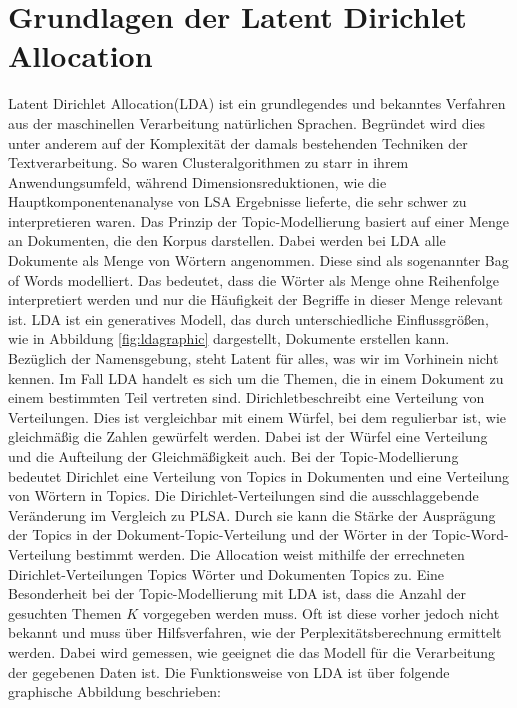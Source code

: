 \documentclass[german,version-2020-11]{uzl-thesis}
\begin{document}
\section{Grundlagen der Latent Dirichlet Allocation }
Latent Dirichlet Allocation(LDA) ist ein grundlegendes und bekanntes Verfahren aus der maschinellen Verarbeitung natürlichen Sprachen. Begründet wird dies unter anderem auf der Komplexität der damals bestehenden Techniken der Textverarbeitung. So waren Clusteralgorithmen zu starr in ihrem Anwendungsumfeld, während Dimensionsreduktionen, wie die Hauptkomponentenanalyse von LSA Ergebnisse lieferte, die sehr schwer zu interpretieren waren. Das Prinzip der Topic-Modellierung basiert auf einer Menge an Dokumenten, die den Korpus darstellen. Dabei werden bei LDA alle Dokumente als Menge von Wörtern angenommen. Diese sind als sogenannter Bag of Words modelliert. Das bedeutet, dass die Wörter als Menge ohne Reihenfolge interpretiert werden und nur die Häufigkeit der Begriffe in dieser Menge relevant ist. LDA ist ein generatives Modell, das durch unterschiedliche Einflussgrößen, wie in Abbildung \ref{fig:ldagraphic} dargestellt, Dokumente erstellen kann. \\

Bezüglich der Namensgebung, steht \glqq Latent \grqq für alles, was wir im Vorhinein nicht kennen. Im Fall LDA handelt es sich um die Themen, die in einem Dokument zu einem bestimmten Teil vertreten sind. \glqq Dirichlet\grqq beschreibt eine Verteilung von Verteilungen. Dies ist vergleichbar mit einem Würfel, bei dem regulierbar ist, wie gleichmäßig die Zahlen gewürfelt werden. Dabei ist der Würfel eine Verteilung und die Aufteilung der Gleichmäßigkeit auch. Bei der Topic-Modellierung bedeutet Dirichlet eine Verteilung von Topics in Dokumenten und eine Verteilung von Wörtern in Topics. Die Dirichlet-Verteilungen sind die ausschlaggebende Veränderung im Vergleich zu PLSA. Durch sie kann die Stärke der Ausprägung der Topics in der Dokument-Topic-Verteilung und der Wörter in der Topic-Word-Verteilung bestimmt werden. Die \glqq Allocation \grqq weist mithilfe der errechneten Dirichlet-Verteilungen Topics Wörter und Dokumenten Topics zu. Eine Besonderheit bei der Topic-Modellierung mit LDA ist, dass die Anzahl der gesuchten Themen $K$ vorgegeben werden muss. Oft ist diese vorher jedoch nicht bekannt und muss über Hilfsverfahren, wie der Perplexitätsberechnung ermittelt werden. Dabei wird gemessen, wie geeignet die das Modell für die Verarbeitung der gegebenen Daten ist. Die Funktionsweise von LDA ist über folgende graphische Abbildung beschrieben: \\
\end{document}
